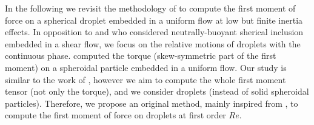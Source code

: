 In the following we revisit the methodology of \citet{stone2001inertial,raja2010inertial,dabade2015}  to compute the first moment of force on a spherical droplet embedded in a uniform flow at low but finite inertia effects. 
In opposition to \citet{stone2001inertial} and \citet{raja2010inertial} who considered neutrally-buoyant sherical inclusion embedded in a shear flow, we focus on the relative motions of droplets with the continuous phase. 
\citet{dabade2015} computed the torque (skew-symmetric part of the first moment) on a spheroidal particle embedded in a uniform flow. 
Our study is similar to the work of \citet{dabade2015}, however we aim to compute the whole first moment tensor (not only the torque), and we consider droplets (instead of solid spheroidal particles). 
Therefore, we propose an original method, mainly inspired from \citet{stone2001inertial}, to compute the first moment of force on droplets at first order $Re$.  

